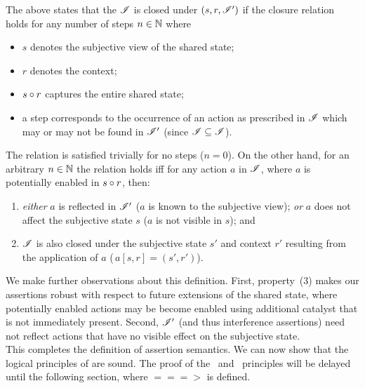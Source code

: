 The above states that the $\mathscr{I}$ is closed under $(s, r, \mathscr{I}')$ if the closure relation holds for any number of steps $n \in \mathbb{N}$ where 
\begin{itemize}
	\item $s$ denotes the subjective view of the shared state; \vspace{0pt}
	\item $r$ denotes the context; \vspace{0pt}
	\item $s \circ r$ captures the entire shared state; \vspace{0pt}
	\item a step corresponds to the occurrence of an action as prescribed in $\mathscr{I}$ which may or may not be found in $\mathscr{I}'$ (since $\mathscr{I} \subseteq \mathscr{I}$). 
\end{itemize}   
%
The relation is satisfied trivially for no steps ($n = 0$). On the other hand, for an arbitrary $n\in \mathbb{N}$ the relation holds iff for any action $a$ in $\mathscr{I}$, where $a$ is potentially enabled in $s \circ r$, then:	
\begin{enumerate}\renewcommand{\theenumi}{\alph{enumi}}
	\item \textit{either} $a$ is reflected in $\mathscr{I}'$ ($a$ is known to the subjective view); 
	\textit{or} $a$ does not affect the subjective state $s$ ($a$ is not visible in $s$); and 
	\item $\mathscr{I}$ is also closed under the subjective state $s'$ and context $r'$ resulting from the application of $a$ ($\,a[s, r]= (s', r')$).
\end{enumerate}
%
%
We make further observations about this definition. First, property~(3) makes our assertions robust with respect to future extensions of the shared state, where potentially enabled actions may be become enabled using additional catalyst that is not immediately present. Second, $\mathscr{I}'$ (and thus interference assertions) need not reflect actions that have no visible effect on the subjective state.\\

This completes the definition of assertion semantics. We can now show that the logical principles of \colosl are sound. The proof of the \shiftRule\ and \extendRule\ principles will be delayed until the following section, where $===>$ is defined.

